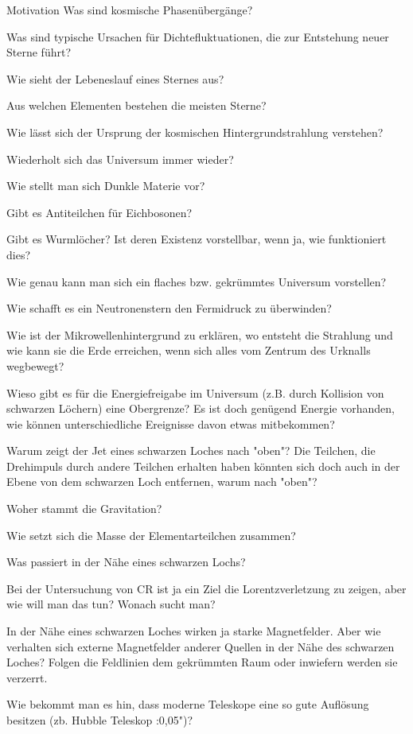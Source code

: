 \begin{frame}{Motivation}
  Was sind kosmische Phasenübergänge?

  Was sind typische Ursachen für Dichtefluktuationen, die zur Entstehung neuer Sterne führt?

  Wie sieht der Lebeneslauf eines Sternes aus?

  Aus welchen Elementen bestehen die meisten Sterne?

  Wie lässt sich der Ursprung der kosmischen Hintergrundstrahlung verstehen?

  Wiederholt sich das Universum immer wieder?

  Wie stellt man sich Dunkle Materie vor?

  Gibt es Antiteilchen für Eichbosonen?

  Gibt es Wurmlöcher? Ist deren Existenz vorstellbar, wenn ja, wie funktioniert dies?

  Wie genau kann man sich ein flaches bzw. gekrümmtes Universum vorstellen?

  Wie schafft es ein Neutronenstern den Fermidruck zu überwinden?

  Wie ist der Mikrowellenhintergrund zu erklären, wo entsteht die Strahlung
  und wie kann sie die Erde erreichen, wenn sich alles vom Zentrum des Urknalls
  wegbewegt?

  Wieso gibt es für die Energiefreigabe im Universum (z.B. durch
  Kollision von schwarzen Löchern) eine Obergrenze? Es ist doch genügend
  Energie vorhanden, wie können unterschiedliche Ereignisse davon etwas
  mitbekommen?

  Warum zeigt der Jet eines schwarzen Loches nach "oben"?
  Die Teilchen, die Drehimpuls durch andere Teilchen erhalten haben könnten
  sich doch auch in der Ebene von dem schwarzen Loch entfernen, warum nach
  "oben"?

  Woher stammt die Gravitation?

  Wie setzt sich die Masse der Elementarteilchen zusammen?

  Was passiert in der Nähe eines schwarzen Lochs?

  Bei der Untersuchung von CR ist ja ein Ziel die Lorentzverletzung zu
  zeigen, aber wie will man das tun? Wonach sucht man?

  In der Nähe eines schwarzen Loches wirken ja starke Magnetfelder. Aber
  wie verhalten sich externe Magnetfelder anderer Quellen in der Nähe des
  schwarzen Loches? Folgen die Feldlinien dem gekrümmten Raum oder inwiefern
  werden sie verzerrt.

  Wie bekommt man es hin, dass moderne Teleskope eine so gute Auflösung
  besitzen (zb. Hubble Teleskop :0,05")?
\end{frame}
